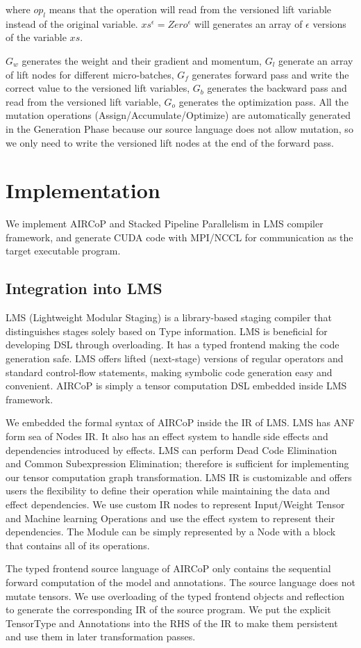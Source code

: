 \documentclass[sigplan, nonacm]{acmart}\settopmatter{printfolios=true,printccs=false,printacmref=false}
\begin{document}
where $op_l$ means that the operation will read from the versioned lift variable instead of the original variable. $xs^\epsilon = Zero^\epsilon$ will generates an array of $\epsilon$ versions of the variable $xs$.\par
$G_w$ generates the weight and their gradient and momentum, $G_l$ generate an array of lift nodes for different micro-batches, $G_f$ generates forward pass and write the correct value to the versioned lift variables, $G_b$ generates the backward pass and read from the versioned lift variable, $G_o$ generates the optimization pass. All the mutation operations (Assign/Accumulate/Optimize) are automatically generated in the Generation Phase because our source language does not allow mutation, so we only need to write the versioned lift nodes at the end of the forward pass.
\section{Implementation} \label{implementation}
We implement AIRCoP and Stacked Pipeline Parallelism in LMS compiler framework\cite{rompf2010lightweight}, and generate CUDA\cite{sanders2010cuda} code with MPI\cite{gropp1999using}/NCCL for communication as the target executable program.\par
\subsection{Integration into LMS}
LMS (Lightweight Modular Staging) is a library-based staging compiler that distinguishes stages solely based on Type information. LMS is beneficial for developing DSL through overloading. It has a typed frontend making the code generation safe. LMS offers lifted (next-stage) versions of regular operators and standard control-flow statements, making symbolic code generation easy and convenient. AIRCoP is simply a tensor computation DSL embedded inside LMS framework.\par
We embedded the formal syntax of AIRCoP inside the IR of LMS. LMS has ANF\cite{flanagan1993essence} form sea of Nodes\cite{click1995simple} IR. It also has an effect system to handle side effects and dependencies introduced by effects. LMS can perform Dead Code Elimination and Common Subexpression Elimination; therefore is sufficient for implementing our tensor computation graph transformation. LMS IR is customizable and offers users the flexibility to define their operation while maintaining the data and effect dependencies. We use custom IR nodes to represent Input/Weight Tensor and Machine learning Operations and use the effect system to represent their dependencies. The Module can be simply represented by a Node with a block that contains all of its operations. \par
The typed frontend source language of AIRCoP only contains the sequential forward computation of the model and annotations. The source language does not mutate tensors. We use overloading of the typed frontend objects and reflection to generate the corresponding IR of the source program. We put the explicit TensorType and Annotations into the RHS of the IR to make them persistent and use them in later transformation passes. \par
\end{document}
